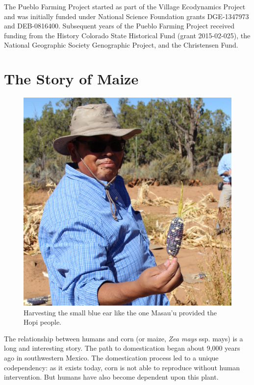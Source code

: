 \documentclass[12pt,]{article}
\begin{document}
The Pueblo Farming Project started as part of the Village Ecodynamics Project and was initially funded under National Science Foundation grants DGE-1347973 and DEB-0816400. Subsequent years of the Pueblo Farming Project received funding from the History Colorado State Historical Fund (grant 2015-02-025), the National Geographic Society Genographic Project, and the Christensen Fund.

\hypertarget{the-story-of-maize}{%
\section{The Story of Maize}\label{the-story-of-maize}}

\begin{figure}
\centering
\includegraphics{./images/chapter_2_header.jpg}
\caption{Harvesting the small blue ear like the one Masau'u provided the Hopi people.}
\end{figure}

The relationship between humans and corn (or maize, \emph{Zea mays} ssp. mays) is a long and interesting story. The path to domestication began about 9,000 years ago in southwestern Mexico. The domestication process led to a unique codependency: as it exists today, corn is not able to reproduce without human intervention. But humans have also become dependent upon this plant.
\end{document}

